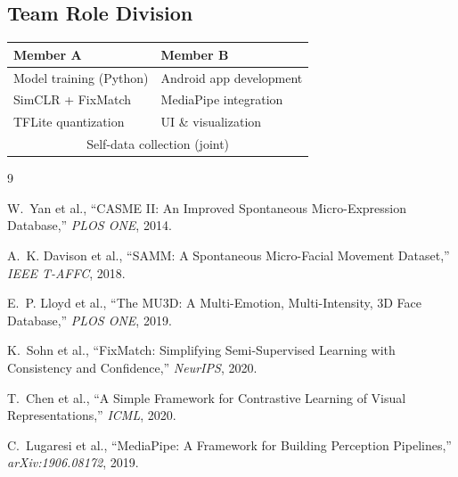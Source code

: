 \documentclass[10pt]{article}
\begin{document}
\subsection*{Team Role Division}

\begin{center}
\small
\begin{tabular}{p{3.5cm} p{3.5cm}}
\toprule
\textbf{Member A} & \textbf{Member B} \\
\midrule
Model training (Python) & Android app development \\
SimCLR + FixMatch & MediaPipe integration \\
TFLite quantization & UI \& visualization \\
\multicolumn{2}{c}{Self-data collection (joint)} \\
\bottomrule
\end{tabular}
\end{center}


\begin{thebibliography}{9}

W.~Yan et al.,
``CASME II: An Improved Spontaneous Micro-Expression Database,''
\textit{PLOS ONE}, 2014.

A.~K. Davison et al.,
``SAMM: A Spontaneous Micro-Facial Movement Dataset,''
\textit{IEEE T-AFFC}, 2018.

E.~P. Lloyd et al.,
``The MU3D: A Multi-Emotion, Multi-Intensity, 3D Face Database,''
\textit{PLOS ONE}, 2019.

K.~Sohn et al.,
``FixMatch: Simplifying Semi-Supervised Learning with Consistency and Confidence,''
\textit{NeurIPS}, 2020.

T.~Chen et al.,
``A Simple Framework for Contrastive Learning of Visual Representations,''
\textit{ICML}, 2020.

C.~Lugaresi et al.,
``MediaPipe: A Framework for Building Perception Pipelines,''
\textit{arXiv:1906.08172}, 2019.

\end{thebibliography}
\end{document}
